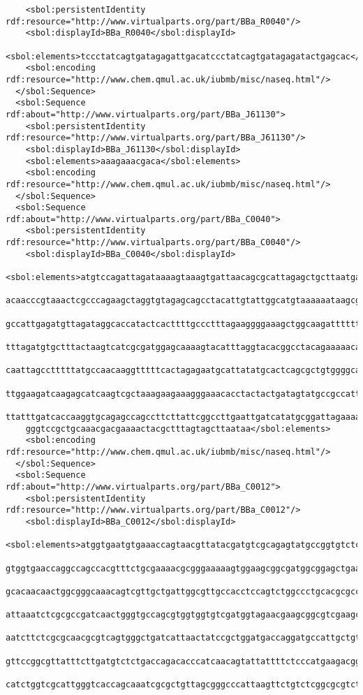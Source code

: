 \begin{lstlisting}
    <sbol:persistentIdentity rdf:resource="http://www.virtualparts.org/part/BBa_R0040"/>
    <sbol:displayId>BBa_R0040</sbol:displayId>
    <sbol:elements>tccctatcagtgatagagattgacatccctatcagtgatagagatactgagcac</sbol:elements>
    <sbol:encoding rdf:resource="http://www.chem.qmul.ac.uk/iubmb/misc/naseq.html"/>
  </sbol:Sequence>
  <sbol:Sequence rdf:about="http://www.virtualparts.org/part/BBa_J61130">
    <sbol:persistentIdentity rdf:resource="http://www.virtualparts.org/part/BBa_J61130"/>
    <sbol:displayId>BBa_J61130</sbol:displayId>
    <sbol:elements>aaagaaacgaca</sbol:elements>
    <sbol:encoding rdf:resource="http://www.chem.qmul.ac.uk/iubmb/misc/naseq.html"/>
  </sbol:Sequence>
  <sbol:Sequence rdf:about="http://www.virtualparts.org/part/BBa_C0040">
    <sbol:persistentIdentity rdf:resource="http://www.virtualparts.org/part/BBa_C0040"/>
    <sbol:displayId>BBa_C0040</sbol:displayId>
    <sbol:elements>atgtccagattagataaaagtaaagtgattaacagcgcattagagctgcttaatgaggtcggaatcgaaggttta
    acaacccgtaaactcgcccagaagctaggtgtagagcagcctacattgtattggcatgtaaaaaataagcgggctttgctcgacgcctta
    gccattgagatgttagataggcaccatactcacttttgccctttagaaggggaaagctggcaagattttttacgtaataacgctaaaagt
    tttagatgtgctttactaagtcatcgcgatggagcaaaagtacatttaggtacacggcctacagaaaaacagtatgaaactctcgaaaat
    caattagcctttttatgccaacaaggtttttcactagagaatgcattatatgcactcagcgctgtggggcattttactttaggttgcgta
    ttggaagatcaagagcatcaagtcgctaaagaagaaagggaaacacctactactgatagtatgccgccattattacgacaagctatcgaa
    ttatttgatcaccaaggtgcagagccagccttcttattcggccttgaattgatcatatgcggattagaaaaacaacttaaatgtgaaagt
    gggtccgctgcaaacgacgaaaactacgctttagtagcttaataa</sbol:elements>
    <sbol:encoding rdf:resource="http://www.chem.qmul.ac.uk/iubmb/misc/naseq.html"/>
  </sbol:Sequence>
  <sbol:Sequence rdf:about="http://www.virtualparts.org/part/BBa_C0012">
    <sbol:persistentIdentity rdf:resource="http://www.virtualparts.org/part/BBa_C0012"/>
    <sbol:displayId>BBa_C0012</sbol:displayId>
    <sbol:elements>atggtgaatgtgaaaccagtaacgttatacgatgtcgcagagtatgccggtgtctcttatcagaccgtttcccgc
    gtggtgaaccaggccagccacgtttctgcgaaaacgcgggaaaaagtggaagcggcgatggcggagctgaattacattcccaaccgcgtg
    gcacaacaactggcgggcaaacagtcgttgctgattggcgttgccacctccagtctggccctgcacgcgccgtcgcaaattgtcgcggcg
    attaaatctcgcgccgatcaactgggtgccagcgtggtggtgtcgatggtagaacgaagcggcgtcgaagcctgtaaagcggcggtgcac
    aatcttctcgcgcaacgcgtcagtgggctgatcattaactatccgctggatgaccaggatgccattgctgtggaagctgcctgcactaat
    gttccggcgttatttcttgatgtctctgaccagacacccatcaacagtattattttctcccatgaagacggtacgcgactgggcgtggag
    catctggtcgcattgggtcaccagcaaatcgcgctgttagcgggcccattaagttctgtctcggcgcgtctgcgtctggctggctggcat

\end{lstlisting}
